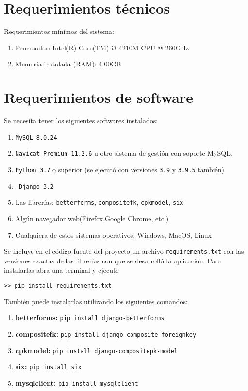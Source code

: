 \documentclass[12pt]{article}
\begin{document}
	\section{Requerimientos t\'ecnicos}
	
	Requerimientos m\'inimos del sistema:
	
	\begin{enumerate}
		\item Procesador: Intel(R) Core(TM) i3-4210M CPU @ 260GHz 
		\item Memoria instalada (RAM): 4.00GB
	\end{enumerate}
	
	\section{Requerimientos de software}
	
	Se necesita tener los siguientes softwares instalados:
	
	\begin{enumerate}
		\item \verb|MySQL 8.0.24|
        \item \verb|Navicat Premiun 11.2.6| u otro sistema de gestión con soporte MySQL.
		\item \verb|Python 3.7| o superior (se ejecutó con versiones \verb|3.9| y \verb|3.9.5| también)
		\item \verb| Django 3.2|
		\item Las librer\'ias: \verb|betterforms|, \verb|compositefk|, \verb|cpkmodel|, \verb|six|
		\item Alg\'un navegador web(Firefox,Google Chrome, etc.)	
        \item Cualquiera de estos sistemas operativos: Windows, MacOS, Linux
	\end{enumerate}	

Se incluye en el código fuente del proyecto un archivo \verb|requirements.txt| con las versiones exactas de las librerías con que se desarrolló la aplicación. Para instalarlas abra una terminal y ejecute 

\verb|>> pip install requirements.txt|

También puede instalarlas utilizando los siguientes comandos:
	\begin{enumerate}
		\item[] \textbf{betterforms:}  \verb|pip install django-betterforms|
		\item[] \textbf{compositefk:} \verb|pip install django-composite-foreignkey|
		\item[] \textbf{cpkmodel:} \verb|pip install django-compositepk-model|
        \item[] \textbf{six:} \verb|pip install six|
        \item[] \textbf{mysqlclient:} \verb|pip install mysqlclient|
	\end{enumerate}	
	
\end{document}
